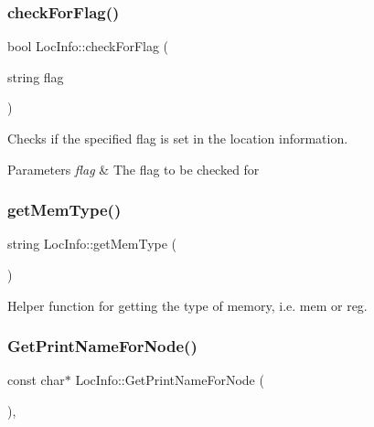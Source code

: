 \mbox{\label{class_loc_info_a3ff1c09b9f5a2e417c39e03168dfd639}} 
\subsubsection{\texorpdfstring{check\+For\+Flag()}{checkForFlag()}}
{\footnotesize\ttfamily bool Loc\+Info\+::check\+For\+Flag (\begin{DoxyParamCaption}\item[{string}]{flag }\end{DoxyParamCaption})}

Checks if the specified flag is set in the location information. 
\begin{DoxyParams}{Parameters}
{\em flag} & The flag to be checked for \\
\hline
\end{DoxyParams}
\mbox{\label{class_loc_info_ae4dcb587c75774e4952af629003076bd}} 
\subsubsection{\texorpdfstring{get\+Mem\+Type()}{getMemType()}}
{\footnotesize\ttfamily string Loc\+Info\+::get\+Mem\+Type (\begin{DoxyParamCaption}{ }\end{DoxyParamCaption})}

Helper function for getting the type of memory, i.\+e. mem or reg. \mbox{\label{class_loc_info_a06b3afd2c766a45dbfe9d4e606845e39}} 
\subsubsection{\texorpdfstring{Get\+Print\+Name\+For\+Node()}{GetPrintNameForNode()}}
{\footnotesize\ttfamily const char$\ast$ Loc\+Info\+::\+Get\+Print\+Name\+For\+Node (\begin{DoxyParamCaption}{ }\end{DoxyParamCaption})\hspace{0.3cm}{\ttfamily [inline]}, {\ttfamily [virtual]}}

